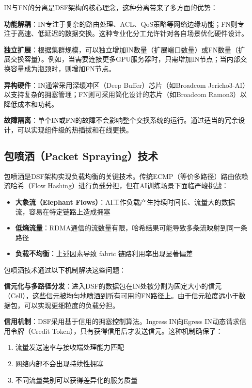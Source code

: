 IN与FN的分离是DSF架构的核心理念，这种分离带来了多方面的优势：

\textbf{功能解耦}：IN专注于复杂的路由处理、ACL、QoS策略等网络边缘功能；FN则专注于高速、低延迟的数据交换。这种专业化分工允许针对各自场景优化硬件设计。

\textbf{独立扩展}：根据集群规模，可以独立增加IN数量（扩展端口数量）或FN数量（扩展交换容量）。例如，当需要连接更多GPU服务器时，只需增加IN节点；当内部交换容量成为瓶颈时，则增加FN节点。

\textbf{异构硬件}：IN通常采用深缓冲区（Deep Buffer）芯片（如Broadcom Jericho3-AI）以支持复杂的拥塞管理；FN则可采用简化设计的芯片（如Broadcom Ramon3）以降低成本和功耗。

\textbf{故障隔离}：单个IN或FN的故障不会影响整个交换系统的运行。通过适当的冗余设计，可以实现组件级的热插拔和在线更换。

\subsection{包喷洒（Packet Spraying）技术}

包喷洒是DSF架构实现负载均衡的关键技术。传统ECMP（等价多路径）路由依赖流哈希（Flow Hashing）进行负载分担，但在AI训练场景下面临严峻挑战：

\begin{itemize}
    \item \textbf{大象流（Elephant Flows）}：AI工作负载产生持续时间长、流量大的数据流，容易在特定链路上造成拥塞
    \item \textbf{低熵流量}：RDMA通信的流数量有限，哈希结果可能导致多条流映射到同一条路径
    \item \textbf{负载不均衡}：上述因素导致 fabric 链路利用率出现显著偏差
\end{itemize}

包喷洒技术通过以下机制解决这些问题：

\textbf{信元化与多路径分发}：进入DSF的数据包在IN处被分割为固定大小的信元（Cell），这些信元被均匀地喷洒到所有可用的FN路径上。由于信元粒度远小于数据包，可以实现更细粒度的负载分担。

\textbf{信用机制}：DSF采用基于信用的拥塞控制算法。Ingress IN向Egress IN动态请求信用令牌（Credit Token），只有获得信用后才发送信元。这种机制确保了：
\begin{enumerate}
    \item 流量发送速率与接收端处理能力匹配
    \item 网络内部不会出现持续性拥塞
    \item 不同流量类别可以获得差异化的服务质量
\end{enumerate}

